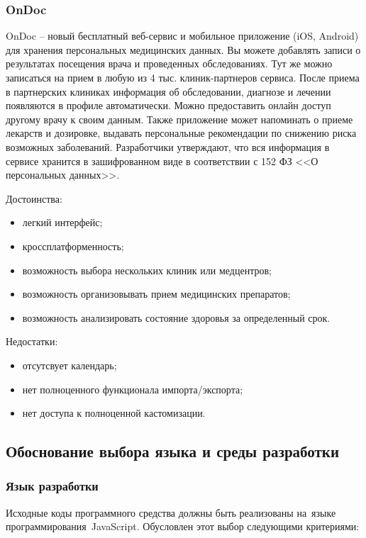 \subsubsection{OnDoc}

OnDoc -- новый бесплатный веб-сервис и мобильное приложение (iOS, Android) для хранения персональных медицинских данных. Вы можете добавлять записи о результатах посещения врача и проведенных обследованиях. Тут же можно записаться на прием в любую из 4 тыс. клиник-партнеров сервиса. После приема в партнерских клиниках информация об обследовании, диагнозе и лечении появляются в профиле автоматически. Можно предоставить онлайн доступ другому врачу к своим данным. Также приложение может напоминать о приеме лекарств и дозировке, выдавать персональные рекомендации по снижению риска возможных заболеваний. Разработчики утверждают, что вся информация в сервисе хранится в зашифрованном виде в соответствии с 152 ФЗ <<О персональных данных>>. 

Достоинства:
\begin{itemize}
  \item легкий интерфейс;
  \item кроссплатформенность;
  \item возможность выбора нескольких клиник или медцентров;
  \item возможность организовывать прием медицинских препаратов;
  \item возможность анализировать состояние здоровья за определенный срок.
\end{itemize}

Недостатки:
\begin{itemize}
  \item отсутсвует календарь;
  \item нет полноценного функционала импорта/экспорта;
  \item нет доступа к полноценной кастомизации.
\end{itemize}


\subsection{Обоснование выбора языка и среды разработки} %
\label{sub:domain:existing_language}

\subsubsection{Язык разработки}

Исходные коды программного средства должны быть реализованы на языке программирования JavaScript. Обусловлен этот выбор следующими критериями:

